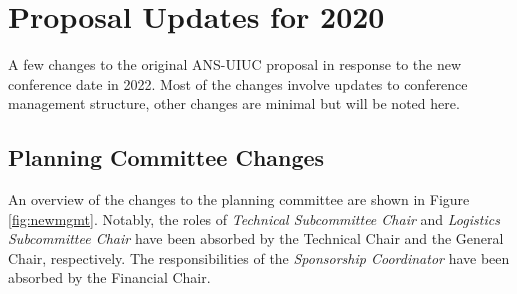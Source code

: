 \section*{Proposal Updates for 2020}


A few changes to the original ANS-UIUC proposal in response to the new conference date in 2022. Most of the changes involve updates to conference management structure, other changes are minimal but will be noted here.

\subsection*{Planning Committee Changes}

An overview of the changes to the planning committee are shown in Figure \ref{fig:newmgmt}. Notably, the roles of \textit{Technical Subcommittee Chair} and \textit{Logistics Subcommittee Chair} have been absorbed by the Technical Chair and the General Chair, respectively. The responsibilities of the  \textit{Sponsorship Coordinator} have been absorbed by the Financial Chair.

